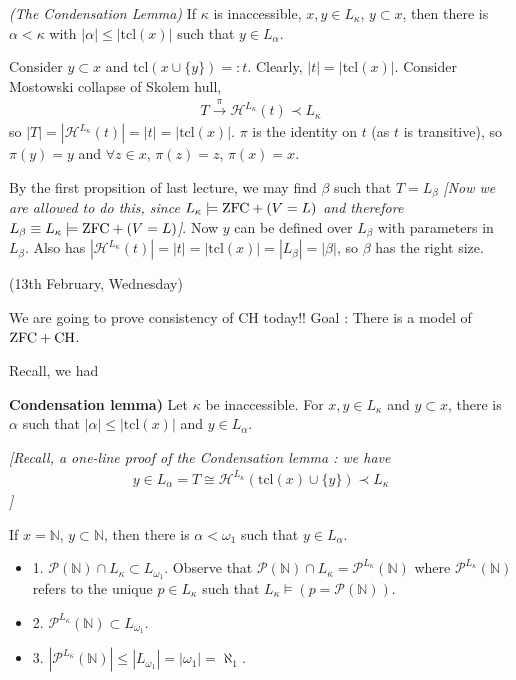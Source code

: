 \documentclass[12pt,a4paper]{article}
\newenvironment{proof}
{\begin{changemargin}{0.5cm}{0.5cm} 
	}%
	{\end{changemargin}
}
\renewenvironment{i}
{\begin{itemize} 
	}%
	{\end{itemize}
}
\newenvironment{p}
{\begin{proof} 
	}%
	{\end{proof}
}
\begin{document}
\thm \emph{(The Condensation Lemma)} If $\kappa$ is inaccessible, $x, y\in L_{\kappa}$, $y\subset x$, then there is $\alpha < \kappa$ with $|\alpha| \leq |\text{tcl}(x)|$ such that $y\in L_{\alpha}$.
\begin{p}
\pf Consider $y\subset x$ and $\text{tcl}(x\cup \{y\}) =:t$. Clearly, $|t| = |\text{tcl}(x)|$. Consider Mostowski collapse of Skolem hull,
\begin{align*}
T \xrightarrow{\pi} \mathcal{H}^{L_{\kappa}}(t) \prec L_{\kappa}
\end{align*}
so $|T| = |\mathcal{H}^{L_{\kappa}}(t)| = |t| = |\text{tcl}(x)|$. $\pi$ is the identity on $t$ (as $t$ is transitive), so $\pi(y)=y$ and $\forall z\in x$, $\pi(z) =z$, $\pi(x)=x$.

\quad By the first propsition of last lecture, we may find $\beta$ such that $T=L_{\beta}$ \emph{[Now we are allowed to do this, since $L_{\kappa} \models \text{ZFC} +(V=L)$ and therefore $L_{\beta} \equiv L_{\kappa} \models \text{ZFC}+(V=L)$]}. Now $y$ can be defined over $L_{\beta}$ with parameters in $L_{\beta}$. Also has $|\mathcal{H}^{L_{\kappa}}(t)| = |t| = |\text{tcl}(x)| = |L_{\beta}|= |\beta|$, so $\beta$ has the right size.

\eop
\end{p}
\s

\newday

(13th February, Wednesday)
\s

We are going to prove consistency of CH today!! Goal : There is a model of $\text{ZFC} + \text{CH}$.
\s

Recall, we had

\textbf{Condensation lemma)} Let $\kappa$ be inaccessible. For $x, y\in L_{\kappa}$ and $y\subset x$, there is $\alpha$ such that $|\alpha| \leq |\text{tcl}(x)|$ and $y\in L_{\alpha}$.
\s

\emph{[Recall, a one-line proof of the Condensation lemma : we have
\begin{align*}
y \in L_{\alpha} = T \cong \mathcal{H}^{L_{\kappa}}(\text{tcl}(x) \cup \{y\}) \prec L_{\kappa}
\end{align*}
]}
\s

 If $x= \mathbb{N}$, $y\subset \mathbb{N}$, then there is $\alpha < \omega_1$ such that $y\in L_{\alpha}$.
\s

\begin{i}
\item[1.] $\mathscr{P}(\mathbb{N}) \cap L_{\kappa} \subset L_{\omega_1}$. Observe that $\mathscr{P}(\mathbb{N}) \cap L_{\kappa} = \mathscr{P}^{L_{\kappa}} (\mathbb{N})$ where $\mathscr{P}^{L_{\kappa}} (\mathbb{N})$ refers to the unique $p\in L_{\kappa}$ such that $L_{\kappa} \models (p = \mathscr{P}(\mathbb{N}))$.
\item[2.] $\mathscr{P}^{L_{\kappa}} (\mathbb{N}) \subset L_{\omega_1}$.
\item[3.] $|\mathscr{P}^{L_{\kappa}} (\mathbb{N})| \leq |L_{\omega_1}| = |\omega_1| = \aleph_1$.
\end{i}
\s
\end{document}
